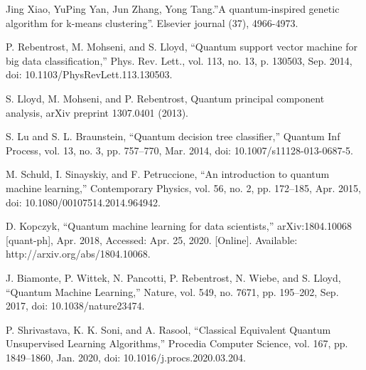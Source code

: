 \documentclass[conference]{IEEEtran}
\begin{document}
\begin{thebibliography}{00}

Jing Xiao, YuPing Yan, Jun Zhang, Yong Tang.”A quantum-inspired genetic algorithm for k-means clustering”. Elsevier
journal (37), 4966-4973. 

P. Rebentrost, M. Mohseni, and S. Lloyd, “Quantum support vector machine for big data classification,” Phys. Rev. Lett., vol. 113, no. 13, p. 130503, Sep. 2014, doi: 10.1103/PhysRevLett.113.130503.

 S. Lloyd, M. Mohseni, and P. Rebentrost, Quantum principal component analysis, arXiv preprint 1307.0401 (2013).

S. Lu and S. L. Braunstein, “Quantum decision tree classifier,” Quantum Inf Process, vol. 13, no. 3, pp. 757–770, Mar. 2014, doi: 10.1007/s11128-013-0687-5.

M. Schuld, I. Sinayskiy, and F. Petruccione, “An introduction to quantum machine learning,” Contemporary Physics, vol. 56, no. 2, pp. 172–185, Apr. 2015, doi: 10.1080/00107514.2014.964942.

D. Kopczyk, “Quantum machine learning for data scientists,” arXiv:1804.10068 [quant-ph], Apr. 2018, Accessed: Apr. 25, 2020. [Online]. Available: http://arxiv.org/abs/1804.10068.

J. Biamonte, P. Wittek, N. Pancotti, P. Rebentrost, N. Wiebe, and S. Lloyd, “Quantum Machine Learning,” Nature, vol. 549, no. 7671, pp. 195–202, Sep. 2017, doi: 10.1038/nature23474.

P. Shrivastava, K. K. Soni, and A. Rasool, “Classical Equivalent Quantum Unsupervised Learning Algorithms,” Procedia Computer Science, vol. 167, pp. 1849–1860, Jan. 2020, doi: 10.1016/j.procs.2020.03.204.

\end{thebibliography}
\end{document}
